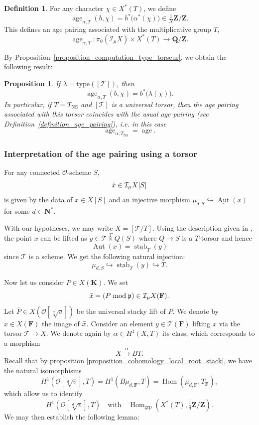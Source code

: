 \documentclass{proc-l}
\newcommand{\Z}{\mathbf{Z}}
\newcommand{\K}{\mathbf{K}}
\newcommand{\N}{\mathbf{N}}
\newcommand{\Q}{\mathbf{Q}}
\newcommand{\F}{\mathbf{F}}
\DeclareMathOperator{\Aut}{Aut}
\DeclareMathOperator{\grp}{grp}
\DeclareMathOperator{\Hom}{Hom}
\DeclareMathOperator{\age}{age}
\DeclareMathOperator{\NS}{NS}
\DeclareMathOperator{\stab}{stab}
\newcommand{\stackT}{\mathcal{T}}
\newcommand{\sheafI}{\mathcal{I}}
\newcommand{\sheafO}{\mathcal{O}}
\newcommand{\sector}{\pi_0(\sheafI_{\mu} X)}
\newtheorem{prop}[theorem]{Proposition}
\theoremstyle{definition}
\newtheorem{definition}[theorem]{Definition}
\theoremstyle{remark}
\numberwithin{equation}{section}
\begin{document}
\begin{definition}\label{definition_general_age_pairing}
For any character $\chi \in X^*(T)$, we define
\[
\age_{\alpha,T}(b,\chi) = b^*\bigl(\alpha^*(\chi)\bigr) \in \tfrac{1}{N}\Z/\Z.
\]
This defines an age pairing associated with the multiplicative group $T$,
\[
\age_{\alpha,T} : \sector \times X^*(T) \longrightarrow \Q/\Z.
\]
\end{definition}

By Proposition~\ref{proposition_computation_type_torseur}, we obtain the following result:

\begin{prop}\label{prop_computation_general_age_pairing_via_type_torseur}
If $\lambda = \mathrm{type}([\stackT])$, then
$$\age_{\alpha,T}(b,\chi) = b^*\bigl(\lambda(\chi)\bigr).$$
In particular, if $T = T_{\NS}$ and $[\stackT]$ is a universal torsor, then the age pairing associated with this torsor coincides with the usual age pairing (see Definition~\ref{definition_age_pairing}), i.e. in this case
$$\age_{\alpha,T_{\NS}} = \age.$$
\end{prop}




\subsubsection{Interpretation of the age pairing using a torsor}



For any connected $\sheafO$-scheme $S$, $$\Tilde{x} \in \sheafI_{\mu} X[S]$$ is given by the data of $x \in X[S]$ and an injective morphism $\mu_{d,S} \hookrightarrow \underline{\Aut}(x)$ for some $d \in \N^*$. 

With our hypotheses, we may write $X = [\stackT/T]$. Using the description given in \cite[paragraph 4.2]{loughran_santens_malle_conjecture}, the point $x$ can be lifted as $y \in \stackT \overset{T}{\times} Q (S) $ where $Q \rightarrow S$ is a $T$-torsor and hence $$\underline{\Aut}(x) = \underline{\stab}_{T}(y) $$since $\stackT$ is a scheme. We get the following natural injection:
$$ \mu_{d,S} \hookrightarrow  \underline{\stab}_{T}(y) \hookrightarrow T .$$

Now let us consider $P \in X(\K)$. We set
\[
\Tilde{x}
=
\left( P \bmod \mathfrak{p} \right)
\in \sheafI_{\mu} X(\F).
\]Let $\overline{P} \in X(\sheafO[\sqrt[d]{v}])$ be the universal stacky lift of $P$. We denote by $x \in X(\F)$ the image of $\Tilde{x}$. Consider an element $y \in \stackT(\F)$ lifting $x$ via the torsor $\stackT \rightarrow X$. We denote again by $\alpha \in H^{1}(X,T)$ its class, which corresponds to a morphism
\[
X \xrightarrow{\alpha} B T.
\]Recall that by proposition \ref{proposition_cohomology_local_root_stack}, we have the natural isomorphisms
$$H^1(\sheafO[\sqrt[d]{v}],T) = H^1(B \mu_{d,\F},T) = \Hom(\mu_{d,\F},T_{\F}),$$
which allow us to identify
\[
H^{1}\!\left(\sheafO[\sqrt[d]{v}], T\right)
\quad\text{with}\quad
\Hom_{\grp}\!\left(X^{*}(T), \tfrac{1}{d}\Z / \Z\right).
\]We may then establish the following lemma:
\end{document}
